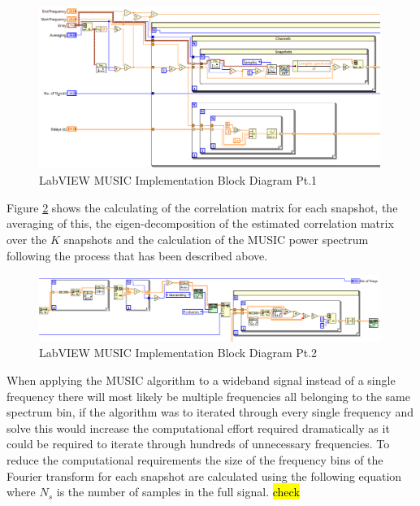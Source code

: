 \documentclass{UoNMCHA}
\numberwithin{equation}{section}
\begin{document}
    \begin{figure}[H]
        \centering
        \includegraphics[keepaspectratio, width = 0.99\textwidth, frame]{Figures/MUSCBlockPt1.png}
        \caption{LabVIEW MUSIC Implementation Block Diagram Pt.1}
        \label{fig:MUSICBlockPt1}
    \end{figure}
    
    Figure \ref{fig:MUSICBlockPt2} shows the calculating of the correlation matrix for each snapshot, the averaging of this, the eigen-decomposition of the estimated correlation matrix over the $K$ snapshots and the calculation of the MUSIC power spectrum following the process that has been described above.

    \begin{figure}[H]
        \centering
        \includegraphics[keepaspectratio, width = 0.99\textwidth, frame]{Figures/MUSICBlockPt2.png}
        \caption{LabVIEW MUSIC Implementation Block Diagram Pt.2}
        \label{fig:MUSICBlockPt2}
    \end{figure}
    
    When applying the MUSIC algorithm to a wideband signal instead of a single frequency there will most likely be multiple frequencies all belonging to the same spectrum bin, if the algorithm was to iterated through every single frequency and solve this would increase the computational effort required dramatically as it could be required to iterate through hundreds of unnecessary frequencies. To reduce the computational requirements the size of the frequency bins of the Fourier transform for each snapshot are calculated using the following equation where $N_s$ is the number of samples in the full signal. \hl{check}
    
\end{document}
